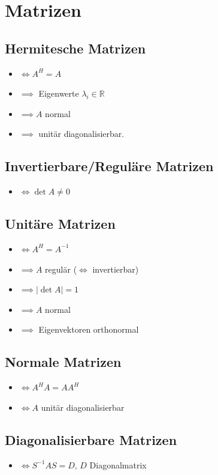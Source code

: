 \section{Matrizen}
\subsection{Hermitesche Matrizen}
\begin{itemize}
    \item $\iff A^H = A$
    \item $\implies$ Eigenwerte $\lambda_i \in \mathbb{R}$
    \item $\implies A$ normal
    \item $\implies$ unitär diagonalisierbar. 
\end{itemize}

\subsection{Invertierbare/Reguläre Matrizen}
\begin{itemize}
    \item $\iff \det{A} \neq 0$ 
\end{itemize}

\subsection{Unitäre Matrizen}
\begin{itemize}
    \item $\iff A^H = A^{-1}$
    \item $\implies A$ regulär ($\iff$ invertierbar)
    \item $\implies |\det{A}| = 1$
    \item $\implies A$ normal
    \item $\implies$ Eigenvektoren orthonormal
\end{itemize} 

\subsection{Normale Matrizen}
\begin{itemize}
    \item $\iff A^H A = A A^H$
    \item $\iff A$ unitär diagonalisierbar
\end{itemize}

\subsection{Diagonalisierbare Matrizen}
\begin{itemize}
    \item $\iff S^{-1}AS = D$, $D$ Diagonalmatrix
\end{itemize}
